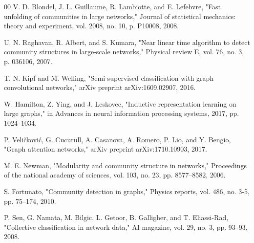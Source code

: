 \documentclass[conference]{IEEEtran}
\begin{document}
\begin{thebibliography}{00}
 V. D. Blondel, J. L. Guillaume, R. Lambiotte, and E. Lefebvre, "Fast unfolding of communities in large networks," Journal of statistical mechanics: theory and experiment, vol. 2008, no. 10, p. P10008, 2008.

 U. N. Raghavan, R. Albert, and S. Kumara, "Near linear time algorithm to detect community structures in large-scale networks," Physical review E, vol. 76, no. 3, p. 036106, 2007.

 T. N. Kipf and M. Welling, "Semi-supervised classification with graph convolutional networks," arXiv preprint arXiv:1609.02907, 2016.

 W. Hamilton, Z. Ying, and J. Leskovec, "Inductive representation learning on large graphs," in Advances in neural information processing systems, 2017, pp. 1024–1034.

 P. Veličković, G. Cucurull, A. Casanova, A. Romero, P. Lio, and Y. Bengio, "Graph attention networks," arXiv preprint arXiv:1710.10903, 2017.

 M. E. Newman, "Modularity and community structure in networks," Proceedings of the national academy of sciences, vol. 103, no. 23, pp. 8577–8582, 2006.

 S. Fortunato, "Community detection in graphs," Physics reports, vol. 486, no. 3-5, pp. 75–174, 2010.

 P. Sen, G. Namata, M. Bilgic, L. Getoor, B. Galligher, and T. Eliassi-Rad, "Collective classification in network data," AI magazine, vol. 29, no. 3, pp. 93–93, 2008.
\end{thebibliography}
\end{document}
